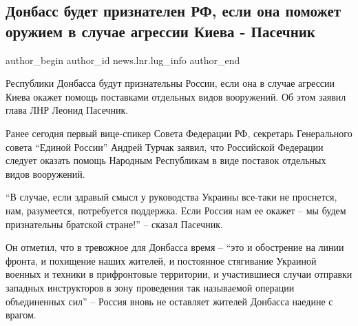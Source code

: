  
 
 
 
 
 
\subsection{Донбасс будет признателен РФ, если она поможет оружием в случае агрессии Киева - Пасечник}
\label{sec:26_01_2022.stz.news.lnr.lug_info.2.rossia_oruzhie_pomosch}
 
\ifcmt
 author_begin
   author_id news.lnr.lug_info
 author_end
\fi

Республики Донбасса будут признательны России, если она в случае агрессии Киева
окажет помощь поставками отдельных видов вооружений. Об этом заявил глава ЛНР
Леонид Пасечник.

Ранее сегодня первый вице-спикер Совета Федерации РФ, секретарь Генерального
совета \enquote{Единой России} Андрей Турчак заявил, что Российской Федерации следует
оказать помощь Народным Республикам в виде поставок отдельных видов вооружений.


\enquote{В случае, если здравый смысл у руководства Украины все-таки не проснется, нам,
разумеется, потребуется поддержка. Если Россия нам ее окажет – мы будем
признательны братской стране!} – сказал Пасечник.

Он отметил, что в тревожное для Донбасса время – \enquote{это и обострение на линии
фронта, и похищение наших жителей, и постоянное стягивание Украиной военных и
техники в прифронтовые территории, и участившиеся случаи отправки западных
инструкторов в зону проведения так называемой операции объединенных сил} –
Россия вновь не оставляет жителей Донбасса наедине с врагом.


